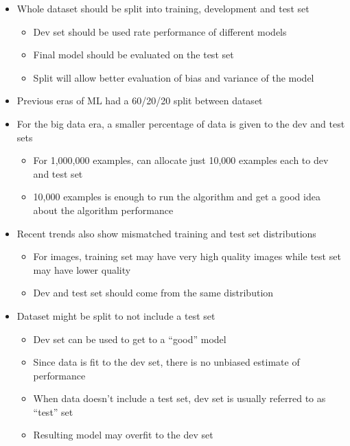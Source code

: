 \documentclass[12pt, letterpaper]{article}
\begin{document}
\begin{itemize}
\begin{itemize}
        \end{itemize}
        \item Whole dataset should be split into training, development and test set
        \begin{itemize}
            \item Dev set should be used rate performance of different models
            \item Final model should be evaluated on the test set
            \item Split will allow better evaluation of bias and variance of the model
        \end{itemize}
        \item Previous eras of ML had a 60/20/20 split between dataset
        \item For the big data era, a smaller percentage of data is given to the dev and test sets
        \begin{itemize}
            \item For 1,000,000 examples, can allocate just 10,000 examples each to dev and test set
            \item 10,000 examples is enough to run the algorithm and get a good idea about the algorithm performance
        \end{itemize}
        \item Recent trends also show mismatched training and test set distributions
        \begin{itemize}
            \item For images, training set may have very high quality images while test set may have lower quality
            \item Dev and test set should come from the same distribution
        \end{itemize}
        \item Dataset might be split to not include a test set
        \begin{itemize}
            \item Dev set can be used to get to a ``good'' model
            \item Since data is fit to the dev set, there is no unbiased estimate of performance
            \item When data doesn't include a test set, dev set is usually referred to as ``test'' set 
            \item Resulting model may overfit to the dev set
        \end{itemize}
    \end{itemize}
\end{document}
